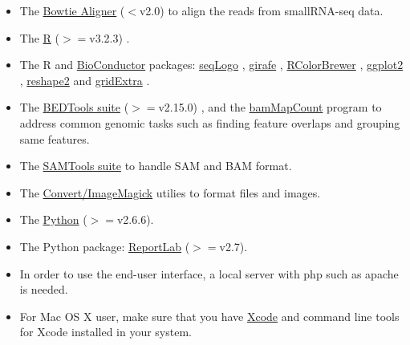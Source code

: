 \documentclass[12pt]{article}
\begin{document}
\begin{itemize}
 \item The \href{http://bowtie-bio.sourceforge.net/manual.shtml}{ Bowtie Aligner} ($<$v2.0) \cite{Langmead2009} to align the reads from smallRNA-seq data.

 \item The \href{http://www.r-project.org/}{ R} ($>=$v3.2.3) \cite{Rcitation}.

 \item The R and \href{http://www.bioconductor.org/}{ BioConductor} \cite{Robert2004} packages:  \href{http://www.bioconductor.org/packages/2.2/bioc/html/seqLogo.html}{ seqLogo} \cite{OliverseqLogo}, \href{http://www.bioconductor.org/packages/2.6/bioc/html/girafe.html}{ girafe} \cite{Joern2010},  \href{http://cran.r-project.org/web/packages/RColorBrewer/index.html}{ RColorBrewer} \cite{Erich2011}, \href{http://ggplot2.org/}{ ggplot2} \cite{Wickham2009}, \href{http://cran.r-project.org/web/packages/reshape2/index.html}{ reshape2} \cite{Wickham2007} and \href{http://cran.r-project.org/web/packages/gridExtra/}{ gridExtra} \cite{Auguie2012}.

 \item The \href{http://code.google.com/p/bedtools/}{ BEDTools suite}  ($>=$v2.15.0) \cite{Quinlan2010}, and the \href{
http://xfer.curie.fr/get/nil/2Rpz9IfJKcZ/BEDTools_MapCount_ColorTag.tar.gz }{ bamMapCount} program  to address common genomic tasks such as finding feature overlaps and grouping same features.

 \item The \href{http://samtools.sourceforge.net/}{ SAMTools suite} \cite{Li2009} to handle SAM and BAM format.

 \item The \href{http://www.imagemagick.org/script/index.php}{ Convert/ImageMagick} utilies to format files and images.

 \item The \href{https://www.python.org/}{ Python} ($>=$v2.6.6).

 \item The Python package: \href{http://www.reportlab.com/opensource/}{ ReportLab} ($>=$v2.7).

 \item In order to use the end-user interface, a local server with php such as apache is needed.

 \item For Mac OS X user, make sure that you have \href{http://developer.apple.com/xcode/}{ Xcode} and command line tools for Xcode installed in your system.
\end{itemize}
\end{document}
